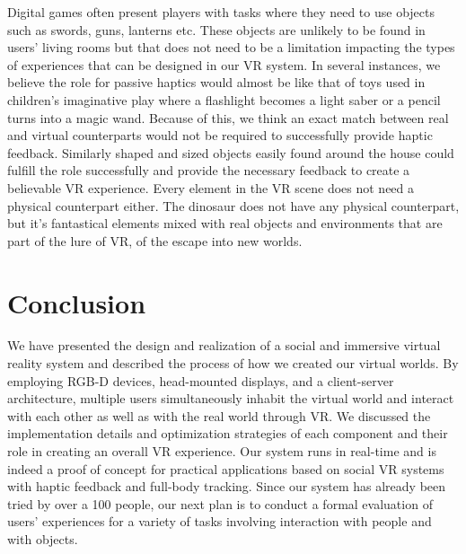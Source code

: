 \documentclass{sigchi}
\begin{document}
 
Digital games often present players with tasks where they need to use objects such as swords, guns, lanterns etc. These objects are unlikely to be found in users' living rooms but that does not need to be a limitation impacting the types of experiences that can be designed in our VR system. In several instances, we believe the role for passive haptics would almost be like that of toys used in children's imaginative play where a flashlight becomes a light saber or a pencil turns into a magic wand. Because of this, we think an exact match between real and virtual counterparts would not be required to successfully provide haptic feedback. Similarly shaped and sized objects easily found around the house could fulfill the role successfully and provide the necessary feedback to create a believable VR experience. Every element in the VR scene does not need a physical counterpart either. The dinosaur does not have any physical counterpart, but it's fantastical elements mixed with real objects and environments that are part of the lure of VR, of the escape into new worlds. 

\section{Conclusion}

We have presented the design and realization of a social and immersive virtual reality system and described the process of how we created our virtual worlds. By employing RGB-D devices, head-mounted displays, and a client-server architecture, multiple users simultaneously inhabit the virtual world and interact with each other as well as with the real world through VR. We discussed the implementation details and optimization strategies of each component and their role in creating an overall VR experience. Our system runs in real-time and is indeed a proof of concept for practical applications based on social VR systems with haptic feedback and full-body tracking. Since our system has already been tried by over a 100 people, our next plan is to conduct a formal evaluation of users' experiences for a variety of tasks involving interaction with people and with objects. 





\end{document}
